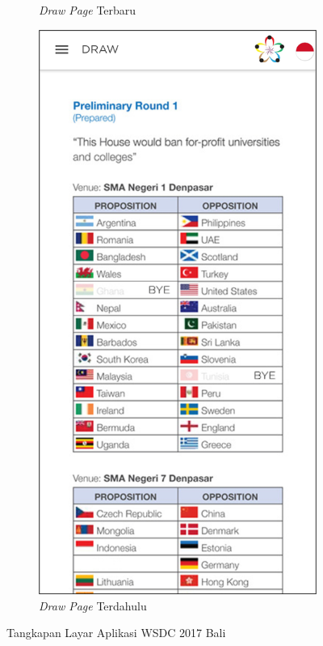 \begin{figure}[H]
\begin{subfigure}[b]{0.3\textwidth}
         \caption{\textit{Draw Page} Terbaru}
         \label{fig:ssDraw}
     \end{subfigure}
     \hspace*{0.5in}
     \begin{subfigure}[b]{0.3\textwidth}
         \centering
         \includegraphics[width=\textwidth]{Gambar/DrawPage.png}
         \caption{\textit{Draw Page} Terdahulu}
         \label{fig:ssDrawOld}
     \end{subfigure}
        \caption{Tangkapan Layar Aplikasi WSDC 2017 Bali}
        \label{fig:ssApk1}
\end{figure}


